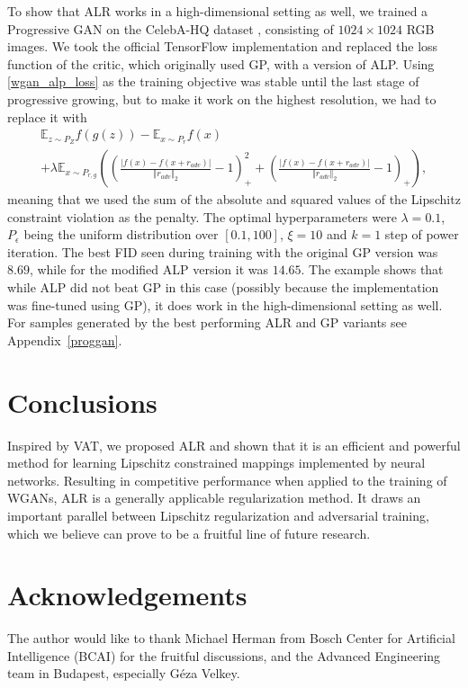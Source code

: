 \documentclass{article}
\begin{document}
To show that ALR works in a high-dimensional setting as well, we trained a Progressive GAN on the CelebA-HQ dataset \citep{Karrasetal2017}, consisting of $1024 \times 1024$ RGB images. We took the official TensorFlow implementation and replaced the loss function of the critic, which originally used GP, with a version of ALP. Using \eqref{wgan_alp_loss} as the training objective was stable until the last stage of progressive growing, but to make it work on the highest resolution, we had to replace it with
\begin{multline} \label{wgan_alp_loss_prog}
\mathbb{E}_{z \sim P_Z}f(g(z)) - \mathbb{E}_{x \sim P_r}f(x)
\\
+\lambda\mathbb{E}_{x \sim P_{r,g}}\left(
\left(\frac{\lvert f(x)-f(x+r_{adv})\rvert}{\Vert r_{adv} \Vert_2}-1\right)^2_+ + 
\left(\frac{\lvert f(x)-f(x+r_{adv})\rvert}{\Vert r_{adv} \Vert_2}-1\right)_+
\right),
\end{multline}
meaning that we used the sum of the absolute and squared values of the Lipschitz constraint violation as the penalty. The optimal hyperparameters were $\lambda=0.1$, $P_\epsilon$ being the uniform distribution over $[0.1, 100]$, $\xi=10$ and $k=1$ step of power iteration. The best FID seen during training with the original GP version was $8.69$, while for the modified ALP version it was $14.65$. The example shows that while ALP did not beat GP in this case (possibly because the implementation was fine-tuned using GP), it does work in the high-dimensional setting as well. For samples generated by the best performing ALR and GP variants see Appendix~\ref{proggan}.

\section{Conclusions}
\label{conclusions}
Inspired by VAT, we proposed ALR and shown that it is an efficient and powerful method for learning Lipschitz constrained mappings implemented by neural networks. Resulting in competitive performance when applied to the training of WGANs, ALR is a generally applicable regularization method. It draws an important parallel between Lipschitz regularization and adversarial training, which we believe can prove to be a fruitful line of future research.

\newpage


\section*{Acknowledgements}
The author would like to thank Michael Herman from Bosch Center for Artificial Intelligence (BCAI) for the fruitful discussions, and the Advanced Engineering team in Budapest, especially G\'eza Velkey.
\end{document}
